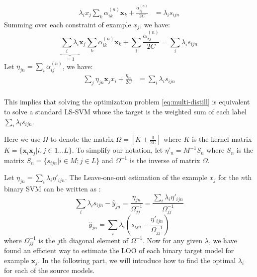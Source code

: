 \begin{equation}
\begin{aligned}
\lambda_ix_j\sum_{k}\alpha^{(n)}_{ik}\textbf{x}_k+\frac{\alpha^{(n)}_{ij}}{2C}&=\lambda_is_{ijn}
\end{aligned}
\end{equation}
Summing over each constraint of example $x_j$, we have:
\begin{equation}
\underbrace{\sum_i\lambda_i}_{=1} \textbf{x}_j\sum_{k}\alpha^{(n)}_{ik}\textbf{x}_k+\sum_i\frac{\alpha^{(n)}_{ij}}{2C}=\sum_i\lambda_is_{ijn}
\end{equation}
Let %
$\eta_{jn}=\sum_i\alpha^{(n)}_{ij}$, we have:
\begin{equation}
\begin{aligned}
\sum_j\eta_{jn}\textbf{x}_jx_i+\frac{\eta_{in}}{2C}&=\sum_i\lambda_is_{ijn}\\
\end{aligned}
\end{equation}

This implies that solving the optimization problem \eqref{eq:multi-distill} is equivalent to solve a standard LS-SVM whose the target is the weighted sum of each label $\sum_i\lambda_is_{ijn}$.

Here we use $\Omega$ to denote the matrix $\Omega=[K+\frac{\mathbf{I}}{2C}]$ where $K$ is the kernel matrix $K=\{\textbf{x}_i\textbf{x}_j|i,j\in 1\dots L\}$. To simplify our notation, let ${\eta}'_{n}=M^{-1}S_n$ where $S_n$ is the matrix $S_n=\{s_{ijn}|i\in M;j\in L\}$ and $\Omega^{-1}$ is the inverse of matrix $\Omega$. 

Let $\eta_{jn}=\sum_i\lambda_i{\eta}'_{ijn}$.
The Leave-one-out estimation of the example $x_j$ for the $n$th binary SVM can be written as \cite{cawley2006leave}:
\[\sum_i\lambda_is_{ijn}-\hat{y}_{jn} =\frac{{\eta}_{jn}}{\Omega_{jj}^{-1}} =\frac{\sum_i\lambda_i{\eta}'_{ijn}}{\Omega_{jj}^{-1}}\]
\begin{equation}\label{eq:yhat}
\hat{y}_{jn} = \sum_i\lambda_i\left(s_{ijn}-\frac{{\eta}'_{ijn}}{\Omega_{jj}^{-1}}\right)
\end{equation}
where $\Omega^{-1}_{jj}$ is the $j$th diagonal element of $\Omega^{-1}$. Now for any given $\lambda$, we have found an efficient way to estimate the LOO of each binary target model for example $\textbf{x}_j$. In the following part, we will introduce how to find the optimal $\lambda_i$ for each of the source models. 
